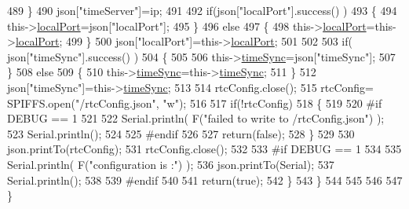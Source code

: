 \begin{DoxyCode}
489             \}
490             json[\textcolor{stringliteral}{"timeServer"}]=ip;
491             
492             \textcolor{keywordflow}{if}(json[\textcolor{stringliteral}{"localPort"}].success() )
493             \{                       
494                 this->\hyperlink{class_cool_time_a2f777da44d7ba678be8185299e9b49d1}{localPort}=json[\textcolor{stringliteral}{"localPort"}];
495             \}
496             \textcolor{keywordflow}{else}
497             \{
498                 this->\hyperlink{class_cool_time_a2f777da44d7ba678be8185299e9b49d1}{localPort}=this->\hyperlink{class_cool_time_a2f777da44d7ba678be8185299e9b49d1}{localPort};
499             \}
500             json[\textcolor{stringliteral}{"localPort"}]=this->\hyperlink{class_cool_time_a2f777da44d7ba678be8185299e9b49d1}{localPort};
501 
502 
503             \textcolor{keywordflow}{if}( json[\textcolor{stringliteral}{"timeSync"}].success() )
504             \{
505 
506                 this->\hyperlink{class_cool_time_a9d032e76c3470a15b3bbbc52af6463f7}{timeSync}=json[\textcolor{stringliteral}{"timeSync"}];
507             \}
508             \textcolor{keywordflow}{else}
509             \{
510                 this->\hyperlink{class_cool_time_a9d032e76c3470a15b3bbbc52af6463f7}{timeSync}=this->\hyperlink{class_cool_time_a9d032e76c3470a15b3bbbc52af6463f7}{timeSync};
511             \}
512             json[\textcolor{stringliteral}{"timeSync"}]=this->\hyperlink{class_cool_time_a9d032e76c3470a15b3bbbc52af6463f7}{timeSync};
513 
514             rtcConfig.close();
515             rtcConfig= SPIFFS.open(\textcolor{stringliteral}{"/rtcConfig.json"}, \textcolor{stringliteral}{"w"});
516             
517             \textcolor{keywordflow}{if}(!rtcConfig)
518             \{
519             
520 \textcolor{preprocessor}{            #if DEBUG == 1}
521 
522                 Serial.println( F(\textcolor{stringliteral}{"failed to write to /rtcConfig.json"}) );
523                 Serial.println();
524             
525 \textcolor{preprocessor}{            #endif}
526 
527                 \textcolor{keywordflow}{return}(\textcolor{keyword}{false});
528             \}
529             
530             json.printTo(rtcConfig);
531             rtcConfig.close();
532 
533 \textcolor{preprocessor}{        #if DEBUG == 1 }
534 
535             Serial.println( F(\textcolor{stringliteral}{"configuration is :"}) );
536             json.printTo(Serial);
537             Serial.println();
538         
539 \textcolor{preprocessor}{        #endif}
540         
541             \textcolor{keywordflow}{return}(\textcolor{keyword}{true}); 
542         \}
543     \}   
544 
545 
546 
547 \}
\end{DoxyCode}
